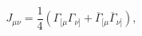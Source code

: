 \begin{equation}
J_{\mu \nu }=\frac 14\left( \Gamma _{[\mu} \Gamma _{\nu ]}
+\overline{\Gamma }_{[\mu} \overline{\Gamma }_{\nu ]}\right) ,
\label{47}
\end{equation}

